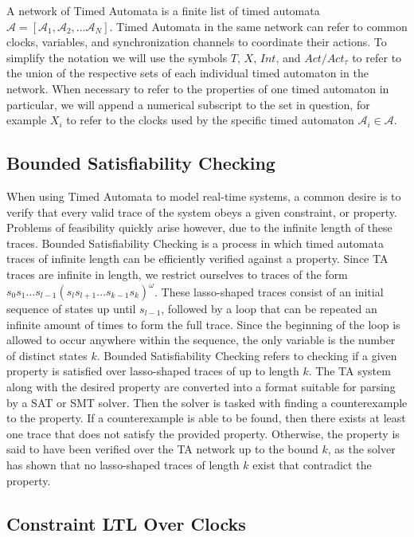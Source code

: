\documentclass[a4paper,12pt]{article}
\begin{document}
A network of Timed Automata is a finite list of timed automata \(\mathcal{A} =
[\mathcal{A}_1, \mathcal{A}_2, \ldots \mathcal{A}_N]\). Timed Automata in the
same network can refer to common clocks, variables, and synchronization channels
to coordinate their actions. To simplify the notation we will use the symbols
\(T\), \(X\), \(Int\), and \(Act/Act_{\tau}\) to refer to the union of the respective
sets of each individual timed automaton in the network. When necessary to refer
to the properties of one timed automaton in particular, we will append a
numerical subscript to the set in question, for example \(X_i\) to refer to the
clocks used by the specific timed automaton \(\mathcal{A}_{i} \in \mathcal{A}\).

\subsection{Bounded Satisfiability Checking}\label{bounded-sat}

When using Timed Automata to model real-time systems, a common desire is to
verify that every valid trace of the system obeys a given constraint, or
property. Problems of feasibility quickly arise however, due to the infinite
length of these traces. Bounded Satisfiability Checking is a process in which
timed automata traces of infinite length can be efficiently verified against a
property. Since TA traces are infinite in
length, we restrict ourselves to traces of the form
\(s_0 s_1\ldots s_{l-1}{(s_l s_{l+1}\ldots s_{k-1}s_k)}^\omega\). These
lasso-shaped traces consist of an initial sequence of states up until
\(s_{l-1}\), followed by a loop that can be repeated an infinite amount of times
to form the full trace. Since the beginning of the loop is allowed to occur
anywhere within the sequence, the only variable is the number of distinct states
\(k\). Bounded Satisfiability Checking refers to checking if a given property is
satisfied over lasso-shaped traces of up to length \(k\).
The TA system along with the desired property are converted into a
format suitable for parsing by a SAT or SMT solver. Then the solver is tasked
with finding a counterexample to the property. If a counterexample is able to be
found, then there exists at least one trace that does not satisfy the provided
property. Otherwise, the property is said to have been verified over the TA
network up to the bound \(k\), as the solver has shown that no lasso-shaped
traces of length \(k\) exist that contradict the property.

\subsection{Constraint LTL Over Clocks}\label{cltloc}
\end{document}
